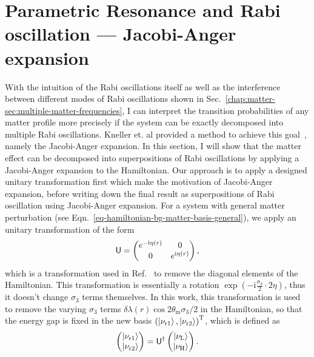 
\section{\label{sec:jacobi}Parametric Resonance and Rabi oscillation --- Jacobi-Anger expansion}


With the intuition of the Rabi oscillations itself as well as the interference between different modes of Rabi oscillations shown in Sec.~\ref{chap:matter-sec:multiple-matter-frequencies}, I can interpret the transition probabilities of any matter profile more precisely if the system can be exactly decomposed into multiple Rabi oscillations. Kneller et. al provided a method to achieve this goal~\cite{Kneller2013}, namely the Jacobi-Anger expansion. In this section, I will show that the matter effect can be decomposed into superpositions of Rabi oscillations by applying a Jacobi-Anger expansion to the Hamiltonian. Our approach is to apply a designed unitary transformation first which make the motivation of Jacobi-Anger expansion, before writing down the final result as superpositions of Rabi oscillation using Jacobi-Anger expansion. For a system with general matter perturbation (see Eqn.~\ref{eq-hamiltonian-bg-matter-basis-general}), we apply an unitary transformation of the form
\begin{equation}
    \mathsf{U} =  \begin{pmatrix} e^{-\ri \eta (r)} & 0 \\  0 & e^{\mathrm i \eta (r)}  \end{pmatrix},
    \label{eq-rabi-transformation}
\end{equation}
which is a transformation used in Ref.~\cite{Kneller2006} to remove the diagonal elements of the Hamiltonian. This transformation is essentially a rotation $\exp\left(-\mathrm i\frac{\sigma_3}{2}\cdot 2\eta\right)$, thus it doesn't change $
\sigma_3$ terms themselves. In this work, this transformation is used to remove the varying $\sigma_3$ terms $\delta\lambda(r) \cos 2\theta_{\mathrm m} \sigma_3/2$ in the Hamiltonian, so that the energy gap is fixed in the new basis $\left(\left| \nu_{\mathrm{r1}}\right\rangle,\left| \nu_{\mathrm{r2}}\right\rangle\right)^{\mathrm{T}}$, which is defined as
\begin{equation}
    \begin{pmatrix} \ket{\nu_{\mathrm{r1}}}\\ \ket{\nu_{\mathrm{r2}}} \end{pmatrix} =  \mathsf{U}^\dagger \begin{pmatrix} \ket{\nu_{\mathrm{L}}} \\ \ket{\nu_{\mathrm{H}}} \end{pmatrix}.
    \label{eq-rabi-basis}
\end{equation}
